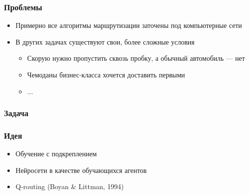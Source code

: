 \documentclass{beamer}
\begin{document}

\begin{frame}
  \frametitle{Проблемы}
  \begin{itemize}
  \item Примерно все алгоритмы маршрутизации заточены под компьютерные сети
  \item В других задачах существуют свои, более сложные условия
    \begin{itemize}
    \item Скорую нужно пропустить сквозь пробку, а обычный автомобиль --- нет
    \item Чемоданы бизнес-класса хочется доставить первыми
    \item ...
    \end{itemize}
  \end{itemize}
\end{frame}


\begin{frame}
  \frametitle{Задача}
\end{frame}


\begin{frame}
  \frametitle{Идея}
  \begin{itemize}
  \item Обучение с подкреплением
  \item Нейросети в качестве обучающихся агентов
  \item Q-routing (Boyan \& Littman, 1994)
  \end{itemize}
\end{frame}

\end{document}
